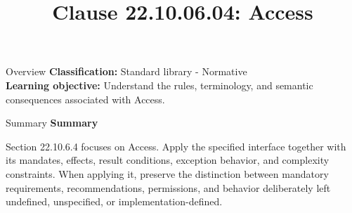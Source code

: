 \documentclass[10pt,letterpaper]{article}
\title{Clause 22.10.06.04: Access}
\author{}
\date{}
\begin{document}
\maketitle
\begin{CornellOverviewBox}{Overview}
\textbf{Classification:} Standard library - Normative\\[2pt]
\textbf{Learning objective:} Understand the rules, terminology, and semantic consequences associated with Access.
\end{CornellOverviewBox}\begin{CornellSummaryBox}{Summary}
{\sffamily\bfseries\color{Accent} Summary}\par\vspace{3pt}Section 22.10.6.4 focuses on Access. Apply the specified interface together with its mandates, effects, result conditions, exception behavior, and complexity constraints. When applying it, preserve the distinction between mandatory requirements, recommendations, permissions, and behavior deliberately left undefined, unspecified, or implementation-defined.
\end{CornellSummaryBox}
\end{document}
